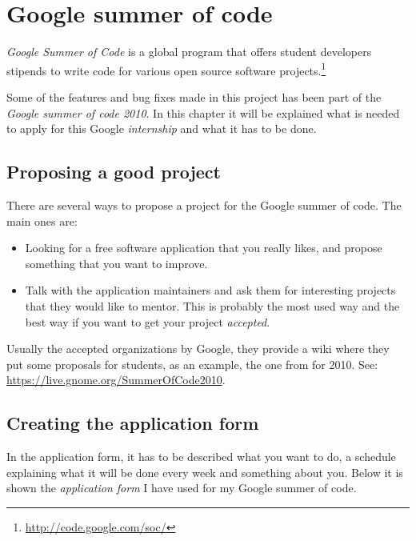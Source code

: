 
\chapter{Google summer of code}


\emph{Google Summer of Code} is a global program that offers student developers stipends to write code for various open source software projects.\footnote{\url{http://code.google.com/soc/}}

Some of the features and bug fixes made in this project has been part of the \emph{Google summer of code 2010}. In this chapter it will be explained what is needed to apply for this Google \emph{internship} and what it has to be done.


\section{Proposing a good project}\label{sec:GoodProject}

There are several ways to propose a project for the Google summer of code. The main ones are:
\begin{itemize}
  \item Looking for a free software application that you really likes, and propose something that you want to improve.
  \item Talk with the application maintainers and ask them for interesting projects that they would like to mentor. This is probably the most used way and the best way if you want to get your project \emph{accepted}.
\end{itemize}

Usually the accepted organizations by Google, they provide a wiki where they put some proposals for students, as an example, the one from \GNOME for 2010. See: \url{https://live.gnome.org/SummerOfCode2010}.

\section{Creating the application form}\label{ApplicationForm}

In the application form, it has to be described what you want to do, a schedule explaining what it will be done every week and something about you. Below it is shown the \emph{application form} I have used for my Google summer of code.

